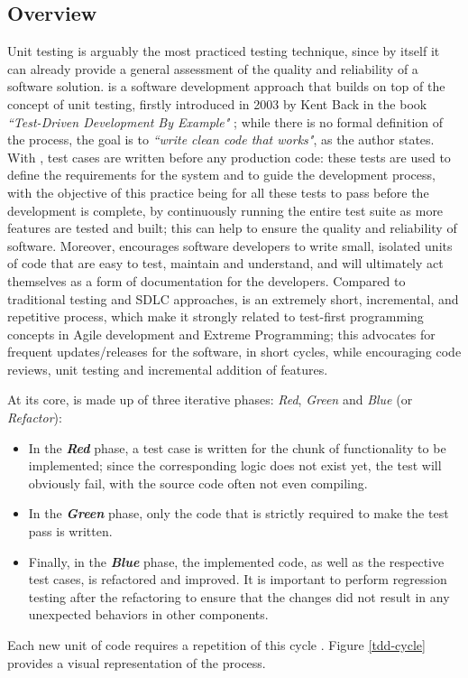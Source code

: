 \subsection{Overview}
Unit testing is arguably the most practiced testing technique, since by itself it can already provide a general assessment of the quality and reliability of a software solution. \tdd is a software development approach that builds on top of the concept of unit testing, firstly introduced in 2003 by Kent Back in the book \textit{``Test-Driven Development By Example"} \cite{TDDByExample}; while there is no formal definition of the process, the goal is to \textit{``write clean code that works"}, as the author states. With \tdd, test cases are written before any production code: these tests are used to define the requirements for the system and to guide the development process, with the objective of this practice being for all these tests to pass before the development is complete, by continuously running the entire test suite as more features are tested and built; this can help to ensure the quality and reliability of software. Moreover, \tdd encourages software developers to write small, isolated units of code that are easy to test, maintain and understand, and will ultimately act themselves as a form of documentation for the developers. 
Compared to traditional testing and SDLC approaches, \tdd is an extremely short, incremental, and repetitive process, which make it strongly related to test-first programming concepts in Agile development and Extreme Programming; this advocates for frequent updates/releases for the software, in short cycles, while encouraging code reviews, unit testing and incremental addition of features.


At its core, \tdd is made up of three iterative phases: \textit{Red}, \textit{Green} and \textit{Blue} (or \textit{Refactor}):
\begin{itemize}
    \item In the \textbf{\textit{Red}} phase, a test case is written for the chunk of functionality to be implemented; since the corresponding logic does not exist yet, the test will obviously fail, with the source code often not even compiling.
    \item In the \textbf{\textit{Green}} phase, only the code that is strictly required to make the test pass is written.
    \item Finally, in the \textbf{\textit{Blue}} phase, the implemented code, as well as the respective test cases, is refactored and improved. It is important to perform regression testing after the refactoring to ensure that the changes did not result in any unexpected behaviors in other components.
\end{itemize}
Each new unit of code requires a repetition of this cycle \cite{GuidelinesTDD}. Figure \ref{tdd-cycle} provides a visual representation of the \tdd process.

